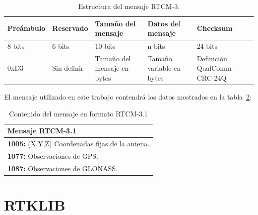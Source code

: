 \begin{table}[!htb]
\begin{center}
\caption{Estructura del mensaje RTCM-3.}
\label{Tab:RTCM-Struct}
\begin{tabular}{|l|l|l|l|l|}
	\hline
	\textbf{\small Preámbulo}& \textbf{\small Reservado}& \textbf{\small Tamaño del mensaje}& \textbf{\small Datos del mensaje}& \textbf{\small Checksum}\\
	\hline
	8 bits & 6 bits & 10 bits & n bits & 24 bits \\
	\hline
	0xD3 & \parbox[t]{1.9cm}{Sin definir} & \parbox[t]{2.9cm}{Tamaño del mensaje en bytes} & \parbox[t]{2.9cm}{Tamaño variable en bytes} & \parbox[t]{2.05cm}{Definición QualComm CRC-24Q}\\
	\hline
\end{tabular}
\end{center}
\end{table}

El mensaje utilizado en este trabajo contendrá los datos mostrados en la tabla~\ref{Tab:RTCM-Conts}: \\

\begin{table}[!htb]
\begin{center}
\caption{Contenido del mensaje en formato RTCM-3.1}
\label{Tab:RTCM-Conts}
\begin{tabular}{|l|}
	\hline
	\textbf{Mensaje RTCM-3.1}\\
	\hline
	\tabitem \textbf{1005:} (X,Y,Z) Coordenadas fijas de la antena. \\
	\tabitem \textbf{1077:} Observaciones de GPS. \\
	\tabitem \textbf{1087:} Observaciones de GLONASS.\footnotemark \\
	\hline
\end{tabular}
\end{center}
\end{table}


\section{RTKLIB}


